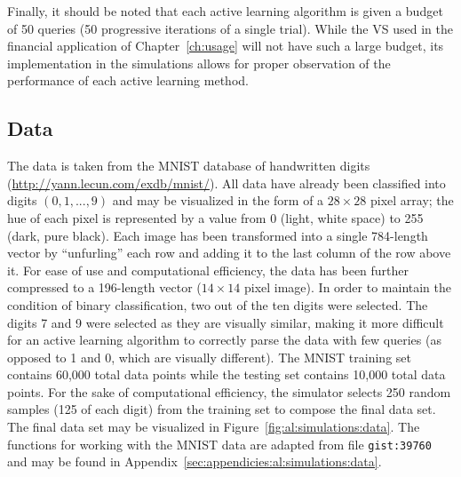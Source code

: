 \noindent Finally, it should be noted that each active learning algorithm is 
given a budget of 50 queries (50 progressive iterations of a single trial). 
While the VS used in the financial application of Chapter~\ref{ch:usage} will 
not have such a large budget, its implementation in the simulations allows 
for proper observation of the performance of each active learning method.

\subsection{Data}
\label{sec:al:simulation:data}
The data is taken from the MNIST database of handwritten digits 
(\url{http://yann.lecun.com/exdb/mnist/}). All data have already been 
classified into digits $(0,1,...,9)$ and may be visualized in the form of a 
$28\times 28$ pixel array; the hue of each pixel is represented by a value from 
0 (light, white space) to 255 (dark, pure black). 
Each image has been transformed into a single 784-length vector by 
``unfurling'' each row and adding it to the last column of the row above it. 
For ease of use and computational efficiency, the data has been 
further compressed to a 196-length vector ($14\times 14$ pixel image). In order 
to maintain the condition of binary classification, two out of the ten digits 
were selected. The digits 7 and 9 were selected as they are visually similar, 
making it more difficult for an active learning algorithm to correctly parse 
the data with few queries (as opposed to 1 and 0, which are visually 
different). The MNIST training set contains 60,000 total data points 
while the testing set contains 10,000 total data points. For the sake of 
computational efficiency, the simulator selects 250 random samples (125 of each 
digit) from the training set to compose the final data set. 
The final data set may be visualized in Figure~\ref{fig:al:simulations:data}. 
The functions for working with the MNIST data are adapted from file 
\texttt{gist:39760}~\cite{oconnor2008} and may be found in 
Appendix~\ref{sec:appendicies:al:simulations:data}.

